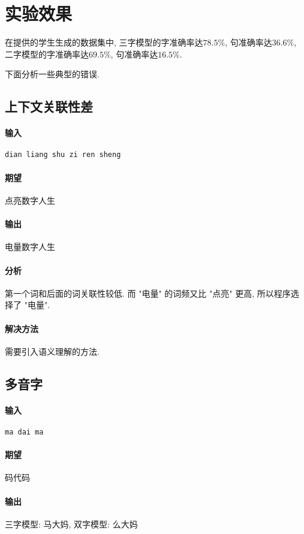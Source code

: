 \section{实验效果}
在提供的学生生成的数据集中, 三字模型的字准确率达$78.5\%$, 句准确率达$36.6\%$, 二字模型的字准确率达$69.5\%$, 句准确率达$16.5\%$.

下面分析一些典型的错误.

\subsection{上下文关联性差}
\paragraph{输入} \texttt{dian liang shu zi ren sheng}

\paragraph{期望} 点亮数字人生

\paragraph{输出} 电量数字人生

\paragraph{分析} 第一个词和后面的词关联性较低. 而 "电量" 的词频又比 "点亮" 更高, 所以程序选择了 "电量".

\paragraph{解决方法} 需要引入语义理解的方法.

\subsection{多音字}
\paragraph{输入} \texttt{ma dai ma}

\paragraph{期望} 码代码

\paragraph{输出} 三字模型: 马大妈, 双字模型: 么大妈

